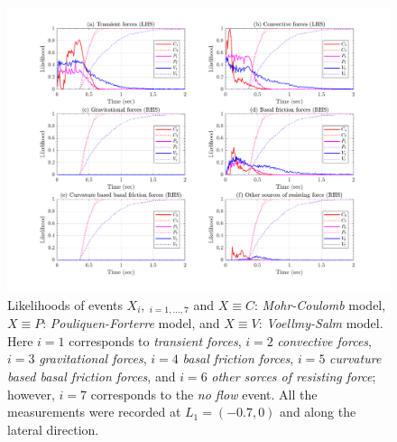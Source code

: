 \documentclass{article}
\begin{document}
\begin{figure}[H]
        \centering
        \includegraphics[width=1\textwidth]{InclinedPlane/LocalRecords/DominancePrY_L1.png}
        \caption{Likelihoods of events $X_i, \ _{i=1,...,7}$ and $X \equiv C$: \emph{Mohr-Coulomb} model, $X \equiv P$: \emph{Pouliquen-Forterre} model, and $X \equiv V$: \emph{Voellmy-Salm} model. Here $i=1$ corresponds to \emph{transient forces}, $i=2$ \emph{convective forces}, $i=3$ \emph{gravitational forces}, $i=4$ \emph{basal friction forces}, $i=5$ \emph{curvature based basal friction forces}, and $i=6$ \emph{other sorces of resisting force}; however, $i=7$ corresponds to the \emph{no flow} event. All the measurements were recorded at $L_1=(-0.7,0)$ and along the lateral direction.}
        \label{fig:Ramp-FYDominance-L1}
\end{figure}
\end{document}
